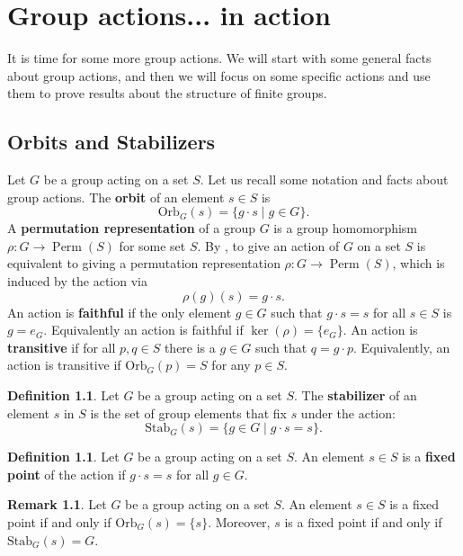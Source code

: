 \documentclass[12pt]{report}
\numberwithin{equation}{section}
\numberwithin{theorem}{chapter}
\theoremstyle{definition}
\newtheorem{definition}[theorem]{Definition}
\newtheorem*{basic properties}{Basic Properties}
\newtheorem*{Important Remark}{Important Remark}
\newtheorem{remark}[theorem]{Remark}
\newcommand{\df}[1]{{\bf #1}\index{#1}}
\DeclareMathOperator{\Perm}{Perm}
\renewcommand{\ker}{\operatorname{ker}}
\begin{document}
\chapter{Group actions... in action}


It is time for some more group actions. We will start with some general facts about group actions, and then we will focus on some specific actions and use them to prove results about the structure of finite groups.

\section{Orbits and Stabilizers}


Let $G$ be a group acting on a set $S$. Let us recall some notation and facts about group actions. The {\bf orbit} of an element $s \in S$ is
$$\mathrm{Orb}_G(s)=\{g\cdot s \mid g\in G\}.$$
A {\bf permutation representation} of a group $G$ is a group homomorphism $\rho\!: G \to \Perm(S)$ for some set $S$. By , to give an action of $G$ on a set $S$ is equivalent to giving a permutation representation $\rho\!: G \to \Perm(S)$, which is induced by the action via
$$\rho(g)(s) = g \cdot s.$$
An action is {\bf faithful} if the only element $g\in G$ such that $g\cdot s=s$ for all $s\in S$ is $g=e_G$. Equivalently an action is  faithful if $\ker(\rho) = \{e_G\}$. 
 An action is {\bf transitive} if for all $p,q \in S$ there is a $g \in G$ such that $q=g\cdot p$. Equivalently, an action is transitive if $\mathrm{Orb}_G(p)=S$ for any $p\in S$.



\begin{definition}
Let $G$ be a group acting on a set $S$. 	
The \df{stabilizer} of an element $s$ in $S$ is the set of group elements that fix $s$ under the action:
$$\mathrm{Stab}_G(s)=\{g\in G \mid g\cdot s=s\}.$$
\end{definition}


\begin{definition}
Let $G$ be a group acting on a set $S$. An element $s \in S$ is a \df{fixed point} of the action if $g \cdot s = s$ for all $g \in G$.
\end{definition}


\begin{remark}
	Let $G$ be a group acting on a set $S$. An element $s \in S$ is a fixed point if and only if $\mathrm{Orb}_G(s) = \{ s \}$. Moreover, $s$ is a fixed point if and only if $\mathrm{Stab}_G(s) = G$.
\end{remark}
\end{document}
